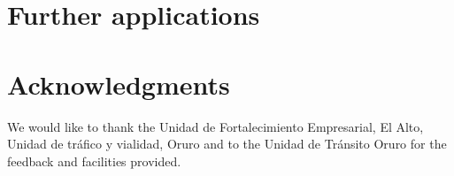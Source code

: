 \documentclass[fleqn,12pt]{SelfArx} %
\begin{document}


\section{Further applications}

\lipsum[15-23] %

\section*{Acknowledgments} %


We would like to thank the Unidad de Fortalecimiento Empresarial, El Alto, Unidad de tráfico y vialidad, Oruro and to the Unidad de Tránsito Oruro for the feedback and facilities provided.




\end{document}
